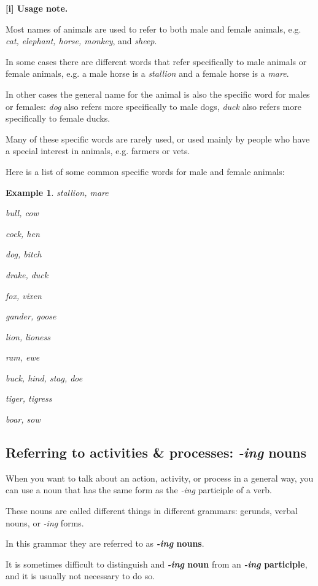 \documentclass[oneside]{book}
\numberwithin{equation}{section}
\newtheorem{example}{Example}[section]
\begin{document}
%
\textbf{[i] Usage note.}

%
\noindent{} Most names of animals are used to refer to both male and female animals, e.g. \textit{cat, elephant, horse, monkey}, and \textit{sheep}.

%
In some cases there are different words that refer specifically to male animals or female animals, e.g. a male horse is a \textit{stallion} and a female horse is a \textit{mare}.

%
In other cases the general name for the animal is also the specific word for males or females: \textit{dog} also refers more specifically to male dogs, \textit{duck} also refers more specifically to female ducks.

%
Many of these specific words are rarely used, or used mainly by people who have a special interest in animals, e.g. farmers or vets.

%
Here is a list of some common specific words for male and female animals:
\begin{example}
    stallion, mare
    
    bull, cow
    
    cock, hen
    
    dog, bitch
    
    drake, duck
    
    fox, vixen
    
    gander, goose
    
    lion, lioness
    
    ram, ewe
    
    buck, hind, stag, doe
    
    tiger, tigress
    
    boar, sow 
\end{example}

\subsection{Referring to activities \& processes: \textit{-ing} nouns}
\noindent{} When you want to talk about an action, activity, or process in a general way, you can use a noun that has the same form as the \textit{-ing} participle of a verb.

%
These nouns are called different things in different grammars: gerunds, verbal nouns, or \textit{-ing} forms.

In this grammar they are referred to as \textbf{\textit{-ing} nouns}.

%
It is sometimes difficult to distinguish and \textbf{\textit{-ing} noun} from an \textbf{\textit{-ing} participle}, and it is usually not necessary to do so.
\end{document}
